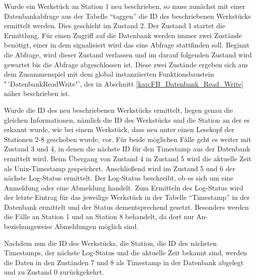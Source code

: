 Wurde ein Werkstück an Station 1 neu beschrieben, so muss zunächst mit einer Datenbankabfrage aus der Tabelle "`taggen"' die ID des beschriebenen Werkstücks ermittelt werden. Dies geschieht im Zustand 2. Der Zustand 1 startet die Ermittlung. Für einen Zugriff auf die Datenbank werden immer zwei Zustände benötigt, einer in dem signalisiert wird das eine Abfrage stattfinden soll. Beginnt die Abfrage, wird dieser Zustand verlassen und im darauf folgenden Zustand wird gewartet bis die Abfrage abgeschlossen ist. Diese zwei Zustände ergeben sich aus dem Zusammenspiel mit dem global instanziierten Funktionsbaustein "´Datenbank\textunderscore Read\textunderscore Write"', der in Abschnitt \ref{kap:FB_Datenbank_Read_Write} näher beschrieben ist.

Wurde die ID des neu beschriebenen Werkstücks ermittelt, liegen genau die gleichen Informationen, nämlich die ID des Werkstücks und die Station an der es erkannt wurde, wie bei einem Werkstück, dass neu unter einen Lesekopf der Stationen 2-8 geschoben wurde, vor. Für beide möglichen Fälle geht es weiter mit Zustand 3 und 4, in denen die nächste ID für den Timestamp aus der Datenbank ermittelt wird. Beim Übergang von Zustand 4 in Zustand 5 wird die aktuelle Zeit als Unix-Timestamp gespeichert. Anschließend wird im Zustand 5 und 6 der nächste Log-Status ermittelt. Der Log-Status beschreibt, ob es sich um eine Anmeldung oder eine Abmeldung handelt. Zum Ermitteln des Log-Status wird der letzte Eintrag für das jeweilige Werkstück in der Tabelle "`Timestamp"' in der Datenbank ermittelt und der Status dementsprechend gesetzt. Besonders werden die Fälle an Station 1 und an Station 8 behandelt, da dort nur An- beziehungsweise Abmeldungen möglich sind.

Nachdem nun die ID des Werkstücks, die Station, die ID des nächsten Timestamps, der nächste Log-Status und die aktuelle Zeit bekannt sind, werden die Daten in den Zuständen 7 und 8 als Timestamp in der Datenbank abgelegt und zu Zustand 0 zurückgekehrt.


